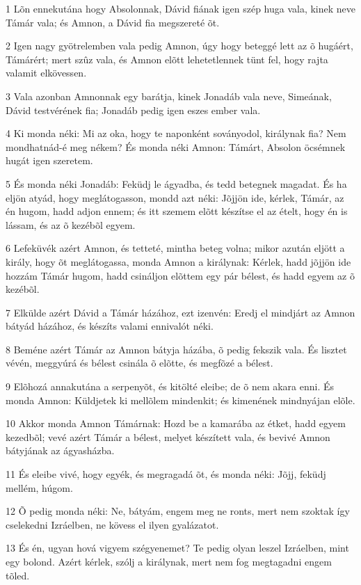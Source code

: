 \par 1 Lõn ennekutána hogy Absolonnak, Dávid fiának igen szép huga vala, kinek neve Támár vala; és Amnon, a Dávid fia megszereté õt.
\par 2 Igen nagy gyötrelemben vala pedig Amnon, úgy hogy beteggé lett az õ hugáért, Támárért; mert szûz vala, és Amnon elõtt lehetetlennek tünt fel, hogy rajta valamit elkövessen.
\par 3 Vala azonban Amnonnak egy barátja, kinek Jonadáb vala neve, Simeának, Dávid testvérének fia; Jonadáb pedig igen eszes ember vala.
\par 4 Ki monda néki: Mi az oka, hogy te naponként soványodol, királynak fia? Nem mondhatnád-é meg nékem? És monda néki Amnon: Támárt, Absolon öcsémnek hugát igen szeretem.
\par 5 És monda néki Jonadáb: Feküdj le ágyadba, és tedd betegnek magadat. És ha eljön atyád, hogy meglátogasson, mondd azt néki: Jõjjön ide, kérlek, Támár, az én hugom, hadd adjon ennem; és itt szemem elõtt készítse el az ételt, hogy én is lássam, és az õ kezébõl egyem.
\par 6 Lefeküvék azért Amnon, és tetteté, mintha beteg volna; mikor azután eljött a király, hogy õt meglátogassa, monda Amnon a királynak: Kérlek, hadd jõjjön ide hozzám Támár hugom, hadd csináljon elõttem egy pár bélest, és hadd egyem az õ kezébõl.
\par 7 Elkülde azért Dávid a Támár házához, ezt izenvén: Eredj el mindjárt az Amnon bátyád házához, és készíts valami ennivalót néki.
\par 8 Beméne azért Támár az Amnon bátyja házába, õ pedig fekszik vala. És lisztet vévén, meggyúrá és bélest csinála õ elõtte, és megfõzé a bélest.
\par 9 Elõhozá annakutána a serpenyõt, és kitölté eleibe; de õ nem akara enni. És monda Amnon: Küldjetek ki mellõlem mindenkit; és kimenének mindnyájan elõle.
\par 10 Akkor monda Amnon Támárnak: Hozd be a kamarába az étket, hadd egyem kezedbõl; vevé azért Támár a bélest, melyet készített vala, és bevivé Amnon bátyjának az ágyasházba.
\par 11 És eleibe vivé, hogy egyék, és megragadá õt, és monda néki: Jõjj, feküdj mellém, húgom.
\par 12 Õ pedig monda néki: Ne, bátyám, engem meg ne ronts, mert nem szoktak így cselekedni Izráelben, ne kövess el ilyen gyalázatot.
\par 13 És én, ugyan hová vigyem szégyenemet? Te pedig olyan leszel Izráelben, mint egy bolond. Azért kérlek, szólj a királynak, mert nem fog megtagadni engem tõled.

